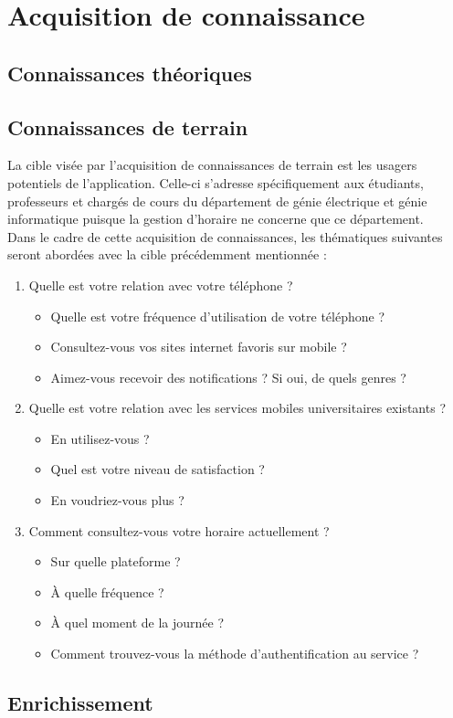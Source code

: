 \section{Acquisition de connaissance}

	\subsection{Connaissances théoriques}
	\subsection{Connaissances de terrain}
	La cible visée par l'acquisition de connaissances de terrain est les usagers potentiels de l'application. Celle-ci s'adresse spécifiquement aux étudiants, professeurs et chargés de cours du département de génie électrique et génie informatique puisque la gestion d'horaire ne concerne que ce département. \\
	
	Dans le cadre de cette acquisition de connaissances, les thématiques suivantes seront abordées avec la cible précédemment mentionnée :

	\begin{enumerate}
		\item Quelle est votre relation avec votre téléphone ?
		\begin{itemize}
			\item Quelle est votre fréquence d'utilisation de votre téléphone ?
			\item Consultez-vous vos sites internet favoris sur mobile ?
			\item Aimez-vous recevoir des notifications ? Si oui, de quels genres ?
		\end{itemize}
		\item Quelle est votre relation avec les services mobiles universitaires existants ?
		\begin{itemize}
			\item En utilisez-vous ?
			\item Quel est votre niveau de satisfaction ?
			\item En voudriez-vous plus ?
		\end{itemize}
		\item Comment consultez-vous votre horaire actuellement ?
		\begin{itemize}
			\item Sur quelle plateforme ?
			\item À quelle fréquence ?
			\item À quel moment de la journée ?
			\item Comment trouvez-vous la méthode d'authentification au service ?
		\end{itemize}
	\end{enumerate}
	
	\subsection{Enrichissement}
	
	
